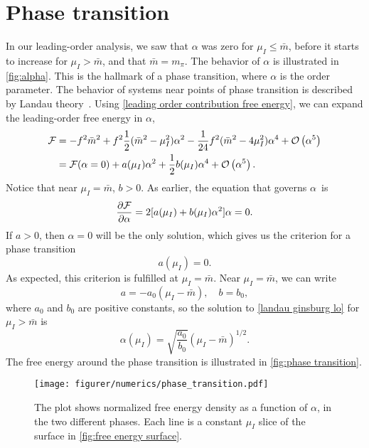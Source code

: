 \section{Phase transition}

In our leading-order analysis, we saw that $\alpha$ was zero for $\mu_I \leq \bar m$, before it starts to increase for $\mu_I>\bar m$, and that $\bar m = m_\pi$.
The behavior of $\alpha$ is illustrated in \autoref{fig:alpha}.
This is the hallmark of a phase transition, where $\alpha$ is the order parameter.
The behavior of systems near points of phase transition is described by Landau theory~\cite{Peskin:IntroQFT}.
Using \cref{leading order contribution free energy}, we can expand the leading-order free energy in $\alpha$,
\begin{align}
    \nonumber
    \Ef
    & = -f^2 \bar m^2 + f^2 \frac{1}{2}(\bar m^2 - \mu_I^2)\alpha^2
    - \frac{1}{24} f^2 (\bar m^2 - 4 \mu_I^2) \alpha^4 + \Oh[5]{\alpha} \\
    & = \Ef(\alpha=0) + a(\mu_I)\alpha^2 + \frac{1}{2} b(\mu_I)\alpha^4 + \Oh[5]{\alpha}.
\end{align}
Notice that near $\mu_I = \bar m$, $b > 0$.
As earlier, the equation that governs $\alpha$ is
\begin{equation}
    \label{landau ginsburg lo}
    \diffp{\Ef}{\alpha} = 2 [a(\mu_I) + b(\mu_I) \alpha^2] \alpha = 0.
\end{equation}
If $a>0$, then $\alpha = 0$ will be the only solution, which gives us the criterion for a phase transition 
\begin{equation}
    a(\mu_I) = 0.
\end{equation}
As expected, this criterion is fulfilled at $\mu_I = \bar m$.
Near $\mu_I = \bar m$, we can write
\begin{equation}
    a = - a_0 (\mu_I - \bar m), \quad b = b_0,
\end{equation}
where $a_0$ and $b_0$ are positive constants, so the solution to \cref{landau ginsburg lo} for $\mu_I>\bar m$ is
\begin{equation}
    \alpha(\mu_I) = \sqrt{\frac{a_0}{b_0}} (\mu_I - \bar m)^{1/2}.
\end{equation}
The free energy around the phase transition is illustrated in \autoref{fig:phase transition}.
\begin{figure}[h]
    \centering
    \texttt{[image: figurer/numerics/phase\_transition.pdf]}
    \caption{The plot shows normalized free energy density as a function of $\alpha$, in the two different phases. Each line is a constant $\mu_I$ slice of the surface in \autoref{fig:free energy surface}.}
    \label{fig:phase transition}
\end{figure}

